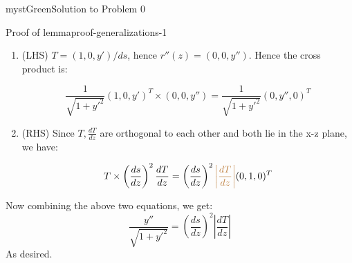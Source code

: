 \begin{mystadmonition}{mystGreen}{Solution to Problem 0}
\begin{mystthmproof}{Proof of lemma}{proof-generalizations-1}
\begin{enumerate}
\item (LHS) $T=(1,0,y')/ds$, hence $r''(z) = (0,0,y'')$. Hence the cross product is:

\begin{equation}
\frac{1}{\sqrt{1+y'^2}} (1,0,y')^T \times (0,0,y'')  = \frac{1}{\sqrt{1+y'^2}}(0,y'',0)^T
\end{equation}


\item (RHS) Since $T, \frac{dT}{dz}$ are orthogonal to each other and both lie in the x-z plane, we have:

\begin{equation}
T \times \left(\frac{ds}{dz}\right)^2\frac{dT}{dz} =  \left(\frac{ds}{dz}\right)^2 \textcolor{brown}{\left|\frac{dT}{dz}\right|} (0,1,0)^T
\end{equation}
\end{enumerate}

Now combining the above two equations, we get:
\begin{equation}
\frac{y''}{\sqrt{1+y'^2}}=\left(\frac{ds}{dz}\right)^2  \left|\frac{dT}{dz}\right|
\end{equation}
As desired.

\end{mystthmproof}
\end{mystadmonition}
